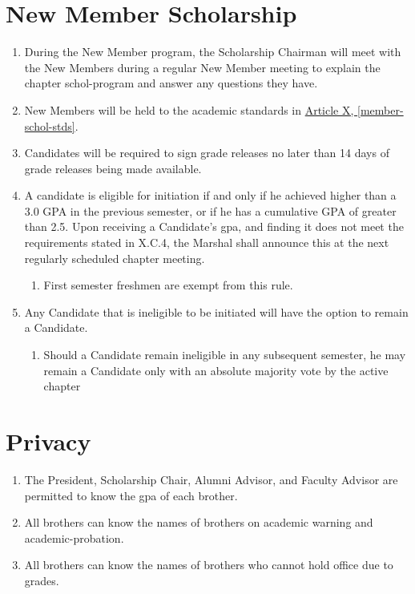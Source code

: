 \section{New Member Scholarship}
	\begin{enumerate}
		\item During the New Member program, the Scholarship Chairman will meet with the New Members during a regular New Member meeting to explain the chapter \Gls{schol-program} and answer any questions they have.

		\item New Members will be held to the academic standards in \hyperref[member-schol-stds]{Article X, \autoref*{member-schol-stds}}.

		\item Candidates will be required to sign grade releases no later than 14 days of grade releases being made available.

		\item A candidate is eligible for initiation if and only if he achieved higher than a 3.0 GPA in the previous semester, or if he has a cumulative GPA of greater than 2.5. Upon receiving a Candidate's \gls{gpa}, and finding it does not meet the requirements stated in X.C.4, the Marshal shall announce this at the next regularly scheduled chapter meeting.

		\begin{enumerate}
			\item First semester freshmen are exempt from this rule.
		\end{enumerate}

		\item Any Candidate that is ineligible to be initiated will have the option to remain a Candidate.

		\begin{enumerate}
			\item Should a Candidate remain ineligible in any subsequent semester, he may remain a Candidate only with an absolute majority vote by the active chapter
		\end{enumerate}

	\end{enumerate}

\section{Privacy}
	\begin{enumerate}
		\item The President, Scholarship Chair, Alumni Advisor, and Faculty Advisor are permitted to know the \gls{gpa} of each brother.

		\item All brothers can know the names of brothers on academic warning and \gls{academic-probation}.

		\item All brothers can know the names of brothers who cannot hold office due to grades.

	\end{enumerate}
